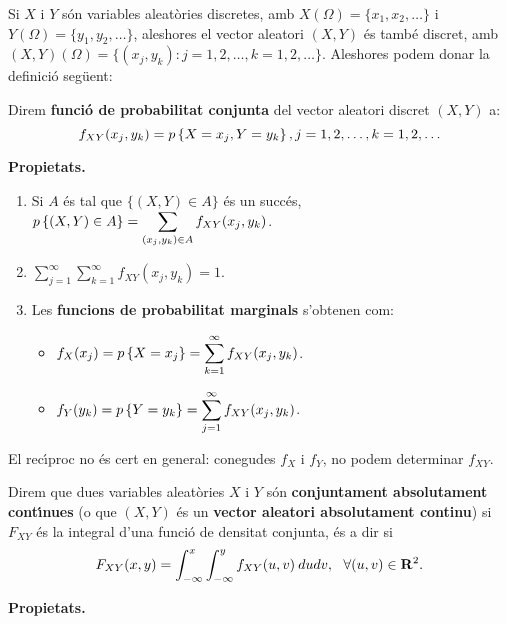 Si $X$ i $Y$ s\'on variables aleat\`ories discretes, amb $X(\Omega) = \{ x_1,
x_2,
\ldots \}$ i $Y(\Omega) = \{ y_1, y_2, \ldots \}$, aleshores el vector aleatori
$(X,Y)$ \'es tamb\'e discret, amb $(X,Y)(\Omega) = \{ (x_j,y_k) : j = 1, 2, \dots
, k
= 1, 2, \ldots \}$. Aleshores podem donar la definici\'o seg\"uent:

\begin{defin}
Direm {\bf funci\'o de probabilitat conjunta}
del vector aleatori discret $(X,Y)$ a: $$f_{XY}(x_j,y_k) = 
p\left\{X = x_j, Y = y_k\right\},
j = 1, 2, \dots , k = 1, 2, \ldots$$ \end{defin}

{\bf Propietats.}

\begin{enumerate}
\item Si $A$ \'es tal que $\{ (X,Y) \in A \} $ \'es un succ\'es, $\displaystyle
p\left\{(X,Y) \in A\right\} = \sum_{(x_j,y_k) \in A} f_{XY}(x_j,y_k)$. \item $\displaystyle \sum_{j=1}^\infty \sum_{k=1}^\infty f_{XY}(x_j,y_k) = 1$.
\item Les {\bf funcions de probabilitat marginals}
s'obtenen com: \begin{itemize}
\item $\displaystyle f_X(x_j) = p\left\{X = x_j\right\} = \sum_{k=1}^\infty f_{XY}(x_j,y_k)$.
\item $\displaystyle f_Y(y_k) = p\left\{Y = y_k\right\} = \sum_{j=1}^\infty f_{XY}(x_j,y_k)$.
\end{itemize}
\end{enumerate}

El rec\'{\i}proc no \'es cert en general: conegudes $f_X$ i $f_Y$, no podem
determinar
$f_{XY}$.

\begin{defin}
Direm que dues variables aleat\`ories $X$ i $Y$ s\'on {\bf conjuntament
absolutament
cont\'{\i}nues} (o que $(X,Y)$ \'es un
{\bf vector aleatori absolutament continu})
 si $F_{XY}$ \'es la integral 
d'una funci\'o de densitat conjunta,
 \'es a dir si $$F_{XY}(x,y) = \int_{-\infty}^x \int_{-\infty}^y f_{XY}(u,v) \> du dv, \ \
\forall (u,v) \in {\bf R}^2.$$
\end{defin}
\newpage
{\bf Propietats.}

